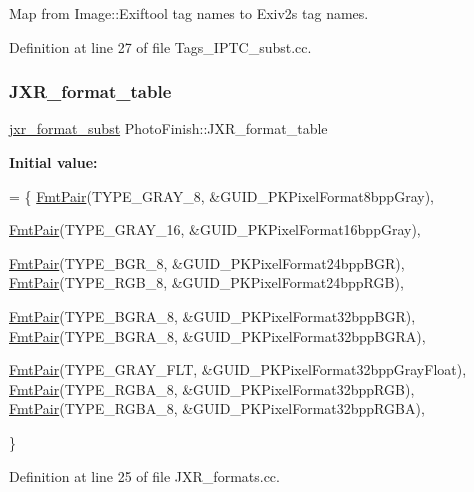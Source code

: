 Map from Image\+::\+Exiftool tag names to Exiv2\textquotesingle{}s tag names. 



Definition at line 27 of file Tags\+\_\+\+I\+P\+T\+C\+\_\+subst.\+cc.

\mbox{\label{namespace_photo_finish_ac16fd09be8f697a59652e494e458a2f7}} 
\subsubsection{\texorpdfstring{J\+X\+R\+\_\+format\+\_\+table}{JXR\_format\_table}}
{\footnotesize\ttfamily \hyperlink{namespace_photo_finish_a230739f3d4e738115f80e9a77e225959}{jxr\+\_\+format\+\_\+subst} Photo\+Finish\+::\+J\+X\+R\+\_\+format\+\_\+table}

{\bfseries Initial value\+:}
\begin{DoxyCode}
= \{
    \hyperlink{_j_x_r_8hh_a7977c90173d0c13e4d47326e9075f79e}{FmtPair}(TYPE\_GRAY\_8, &GUID\_PKPixelFormat8bppGray),

    \hyperlink{_j_x_r_8hh_a7977c90173d0c13e4d47326e9075f79e}{FmtPair}(TYPE\_GRAY\_16, &GUID\_PKPixelFormat16bppGray),
    

    \hyperlink{_j_x_r_8hh_a7977c90173d0c13e4d47326e9075f79e}{FmtPair}(TYPE\_BGR\_8, &GUID\_PKPixelFormat24bppBGR),
    \hyperlink{_j_x_r_8hh_a7977c90173d0c13e4d47326e9075f79e}{FmtPair}(TYPE\_RGB\_8, &GUID\_PKPixelFormat24bppRGB),

    \hyperlink{_j_x_r_8hh_a7977c90173d0c13e4d47326e9075f79e}{FmtPair}(TYPE\_BGRA\_8, &GUID\_PKPixelFormat32bppBGR),
    \hyperlink{_j_x_r_8hh_a7977c90173d0c13e4d47326e9075f79e}{FmtPair}(TYPE\_BGRA\_8, &GUID\_PKPixelFormat32bppBGRA),
    
    \hyperlink{_j_x_r_8hh_a7977c90173d0c13e4d47326e9075f79e}{FmtPair}(TYPE\_GRAY\_FLT, &GUID\_PKPixelFormat32bppGrayFloat),
    \hyperlink{_j_x_r_8hh_a7977c90173d0c13e4d47326e9075f79e}{FmtPair}(TYPE\_RGBA\_8, &GUID\_PKPixelFormat32bppRGB),
    \hyperlink{_j_x_r_8hh_a7977c90173d0c13e4d47326e9075f79e}{FmtPair}(TYPE\_RGBA\_8, &GUID\_PKPixelFormat32bppRGBA),
    
  \}
\end{DoxyCode}


Definition at line 25 of file J\+X\+R\+\_\+formats.\+cc.

